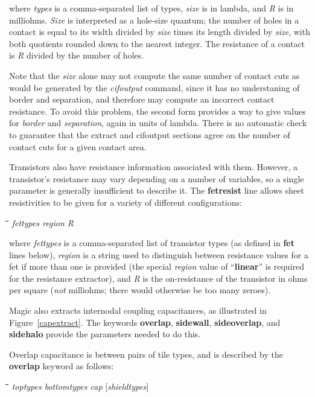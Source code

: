 \documentclass[letterpaper,twoside,12pt]{article}
\def\hinch{\hspace*{0.5in}}
\def\starti{\begin{center}\begin{tabbing}\hinch\=\hinch\=\hinch\=\hinch\=\kill}
\def\endi{\end{tabbing}\end{center}}
\def\ii{\>\>\>}
\begin{document}
where {\itshape types} is a comma-separated list of types, {\itshape size}
is in lambda, and {\itshape R} is in milliohms.  {\itshape Size} is interpreted
as a hole-size quantum; the number of holes in a contact is equal to
its width divided by {\itshape size} times its length divided by {\itshape size},
with both quotients rounded down to the nearest integer.  The resistance
of a contact is {\itshape R} divided by the number of holes.

Note that the {\itshape size} alone may not compute the same number of
contact cuts as would be generated by the {\itshape cifoutput} command,
since it has no understaning of border and separation, and therefore may
compute an incorrect contact resistance.  To avoid this problem, the
second form provides a way to give values for {\itshape border} and
{\itshape separation}, again in units of lambda.  There is no automatic
check to guarantee that the extract and cifoutput sections agree on the
number of contact cuts for a given contact area.

Transistors also have resistance information associated with them.
However, a transistor's resistance may vary depending on a number
of variables, so a single parameter is generally insufficient to
describe it.  The {\bfseries fetresist} line allows sheet resistivities
to be given for a variety of different configurations:

\starti
   \ii {\bfseries fetresist} {\itshape fettypes region R}
\endi

where {\itshape fettypes} is a comma-separated list of transistor types
(as defined in {\bfseries fet} lines below), {\itshape region} is a string
used to distinguish between resistance values for a fet if more
than one is provided (the special {\itshape region} value of ``{\bfseries linear}''
is required for the resistance extractor), and {\itshape R} is the on-resistance
of the transistor in ohms per square ({\itshape not} milliohms; there would
otherwise be too many zeroes).

Magic also extracts internodal coupling capacitances, as
illustrated in Figure~\ref{capextract}.
The keywords
{\bfseries overlap}, {\bfseries sidewall}, {\bfseries sideoverlap},
and {\bfseries sidehalo} provide the parameters needed to do this.

Overlap capacitance is between pairs of tile types,
and is described by the {\bfseries overlap} keyword as follows:

\starti
   \ii {\bfseries overlap} {\itshape toptypes bottomtypes cap} [{\itshape shieldtypes}]
\endi
\end{document}
